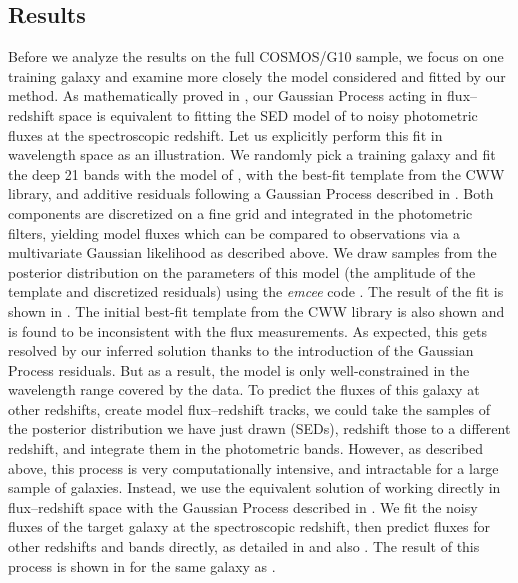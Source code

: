 \documentclass[aps,prd,showpacs,superscriptaddress,groupedaddress]{revtex4}  %
\begin{document}
\subsection{Results}

Before we analyze the results on the full COSMOS/G10 sample, we focus on one training galaxy and examine more closely the model considered and fitted by our method.
As mathematically proved in , our Gaussian Process acting in flux--redshift space is equivalent to fitting the SED model of  to noisy photometric fluxes at the spectroscopic redshift.
Let us explicitly perform this fit in wavelength space as an illustration.
We randomly pick a training galaxy and fit the deep 21 bands with the model of , \ie with the best-fit template from the CWW library, and additive residuals following a Gaussian Process described in .
Both components are discretized on a fine grid and integrated in the photometric filters, yielding model fluxes which can be compared to observations via a multivariate Gaussian likelihood as described above. 
We draw samples from the posterior distribution on the parameters of this model (the amplitude of the template and discretized residuals) using the \textit{emcee} code \citep{emcee:2013}.
The result of the fit is shown in . 
The initial best-fit template from the CWW library is also shown and is found to be inconsistent with the flux measurements.
As expected, this gets resolved by our inferred solution thanks to the introduction of the Gaussian Process residuals.
But as a result, the model is only well-constrained in the wavelength range covered by the data. 
To predict the fluxes of this galaxy at other redshifts, \ie create model flux--redshift tracks, we could take the samples of the posterior distribution we have just drawn (SEDs), redshift those to a different redshift, and integrate them in the photometric bands.
However, as described above, this process is very computationally intensive, and intractable for a large sample of galaxies. 
Instead, we use the equivalent solution of working directly in flux--redshift space with the Gaussian Process described in .
We fit the noisy fluxes of the target galaxy at the spectroscopic redshift, then predict fluxes for other redshifts and bands directly, as detailed in  and also .
The result of this process is shown in  for the same galaxy as .
\end{document}
